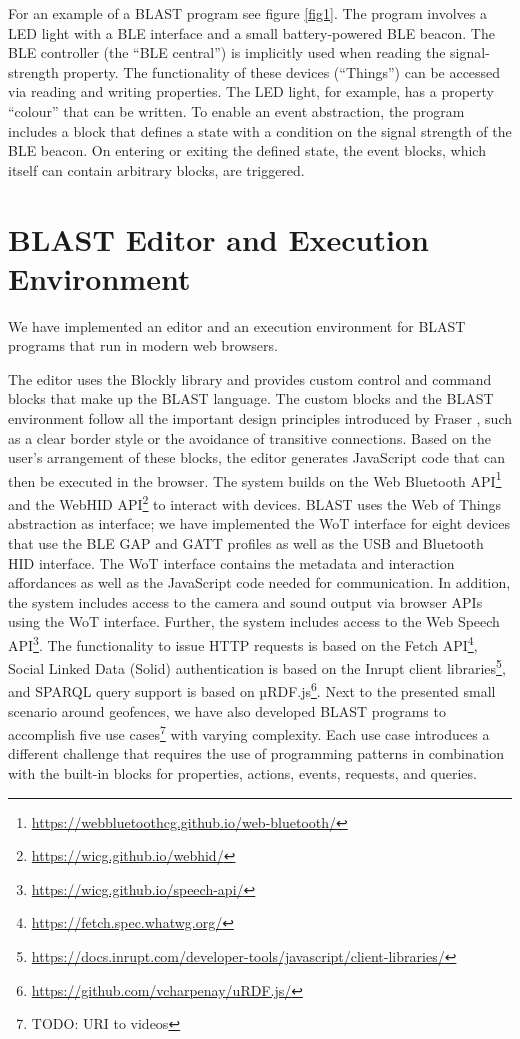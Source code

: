 \documentclass[runningheads]{llncs}
\begin{document}
For an example of a BLAST program see figure \ref{fig1}.
The program involves a LED light with a BLE interface and a small battery-powered BLE beacon.
The BLE controller (the ``BLE central'') is implicitly used when reading the signal-strength property.
The functionality of these devices (``Things'') can be accessed via reading and writing properties.
The LED light, for example, has a property ``colour'' that can be written.
To enable an event abstraction, the program includes a block that defines a state with a condition on the signal strength of the BLE beacon.
On entering or exiting the defined state, the event blocks, which itself can contain arbitrary blocks, are triggered.

\section{BLAST Editor and Execution Environment}

We have implemented an editor and an execution environment for BLAST programs that run in modern web browsers.

The editor uses the Blockly library and provides custom control and command blocks that make up the BLAST language. The custom blocks and the BLAST environment follow all the important design principles introduced by Fraser \cite{fraser}, such as a clear border style or the avoidance of transitive connections.
Based on the user's arrangement of these blocks, the editor generates JavaScript code that can then be executed in the browser.
The system builds on the Web Bluetooth API\footnote{\url{https://webbluetoothcg.github.io/web-bluetooth/}} and the WebHID API\footnote{\url{https://wicg.github.io/webhid/}} to interact with devices.
BLAST uses the Web of Things abstraction as interface; we have implemented the WoT interface for eight devices that use the BLE GAP and GATT profiles as well as the USB and Bluetooth HID interface.
The WoT interface contains the metadata and interaction affordances as well as the JavaScript code needed for communication.
In addition, the system includes access to the camera and sound output via browser APIs using the WoT interface.
Further, the system includes access to the Web Speech API\footnote{\url{https://wicg.github.io/speech-api/}}.
The functionality to issue HTTP requests is based on the Fetch API\footnote{\url{https://fetch.spec.whatwg.org/}}, Social Linked Data (Solid) authentication is based on the Inrupt client libraries\footnote{\url{https://docs.inrupt.com/developer-tools/javascript/client-libraries/}}, and SPARQL query support is based on µRDF.js\footnote{\url{https://github.com/vcharpenay/uRDF.js/}}.
Next to the presented small scenario around geofences, we have also developed BLAST programs to accomplish five use cases\footnote{TODO: URI to videos} with varying complexity. Each use case introduces a different challenge that requires the use of programming patterns in combination with the built-in blocks for properties, actions, events, requests, and queries.
\end{document}
